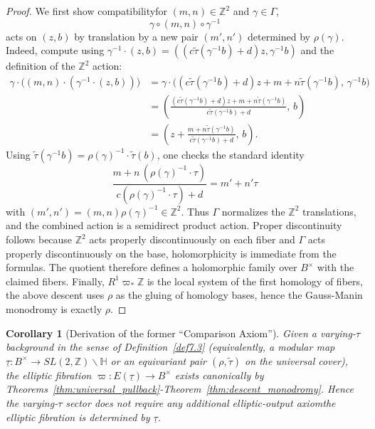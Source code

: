 \documentclass[11pt]{article}
\newtheorem{corollary}[theorem]{Corollary}
\theoremstyle{remark}
\begin{document}
{\begin{proof}
We first show compatibility\:for $(m,n)\in\mathbb{Z}^2$ and $\gamma\in\Gamma$,
\begin{equation}
\gamma\circ(m,n)\circ\gamma^{-1}
\end{equation}
acts on $(z,b)$ by translation by a new pair $(m',n')$ determined by $\rho(\gamma)$.
Indeed, compute using $\gamma^{-1}\cdot(z,b)=((c\widetilde{\tau}(\gamma^{-1}b)+d)z,\gamma^{-1}b)$ and the definition of the
$\mathbb{Z}^2$ action:
\begin{align}
\gamma\cdot\big((m,n)\cdot(\gamma^{-1}\cdot(z,b))\big)
&=\gamma\cdot\big((c\widetilde{\tau}(\gamma^{-1}b)+d)z + m + n\widetilde{\tau}(\gamma^{-1}b),\,\gamma^{-1}b\big)\nonumber\\
&=\left(\frac{(c\widetilde{\tau}(\gamma^{-1}b)+d)z + m + n\widetilde{\tau}(\gamma^{-1}b)}{c\widetilde{\tau}(\gamma^{-1}b)+d},\,b\right)\nonumber\\
&=\left(z + \frac{m+n\widetilde{\tau}(\gamma^{-1}b)}{c\widetilde{\tau}(\gamma^{-1}b)+d},\,b\right).
\end{align}
Using $\widetilde{\tau}(\gamma^{-1}b)=\rho(\gamma)^{-1}\cdot\widetilde{\tau}(b)$, one checks the standard identity
\begin{equation}
\frac{m+n\,(\rho(\gamma)^{-1}\cdot\tau)}{c(\rho(\gamma)^{-1}\cdot\tau)+d} = m' + n'\tau
\end{equation}
with $(m',n')=(m,n)\rho(\gamma)^{-1}\in\mathbb{Z}^2$.
Thus $\Gamma$ normalizes the $\mathbb{Z}^2$ translations, and the combined action is a semidirect product action.
Proper discontinuity follows because $\mathbb{Z}^2$ acts properly discontinuously on each fiber and $\Gamma$ acts properly discontinuously
on the base, holomorphicity is immediate from the formulas.
The quotient therefore defines a holomorphic family over $B^{\times}$ with the claimed fibers.
Finally, $R^1\varpi_*\mathbb{Z}$ is the local system of the first homology of fibers, the above descent uses $\rho$
as the gluing of homology bases, hence the Gauss-Manin monodromy is exactly $\rho$.
\end{proof}

\begin{corollary}[Derivation of the former      ``Comparison Axiom'']
\label{cor:CA_derived}
Given a varying-$\tau$ background in the sense of Definition~\eqref{def7.3}
(equivalently, a modular map
$\underline{\tau}  : B^{\times} \to SL(2,\mathbb{Z}) \backslash \mathbb{H}$
or an equivariant pair $(\rho,\widetilde{\tau})$ on the universal cover),
the elliptic fibration $\varpi  : E(\underline{\tau}) \to B^{\times}$
exists canonically by Theorems~\eqref{thm:universal_pullback}-Theorem~\eqref{thm:descent_monodromy}. Hence the varying-$\tau$ sector
does not require any additional elliptic-output axiom\:the elliptic
fibration is determined by $\underline{\tau}$.


\end{corollary}}
\end{document}
